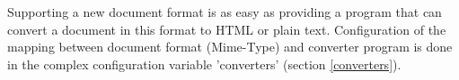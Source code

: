 Supporting a new document format is as easy as providing a program
that can convert a document in this format to HTML or plain text.
Configuration of the mapping between document format (Mime-Type) and converter program is done in the complex configuration variable 'converters' (section  \ref{converters}). 

%

